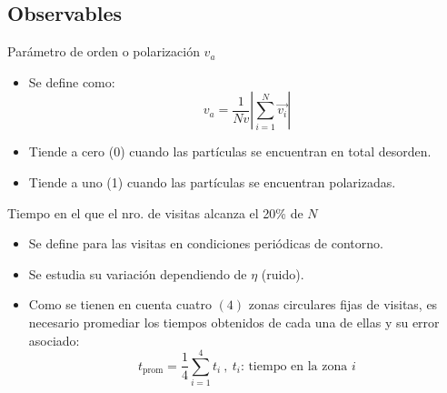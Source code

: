 \documentclass{beamer}
\begin{document}
        \subsection{Observables}

            \begin{frame}{Parámetro de orden o polarización $v_a$}
                \begin{itemize}
                    \item Se define como:
                    \begin{equation}
                        v_a = \frac{1}{Nv} \left|\sum_{i=1}^{N} \vec{v_i} \right|
                    \end{equation}
                    \item Tiende a cero (0) cuando las partículas se encuentran en total desorden.
                    \item Tiende a uno (1) cuando las partículas se encuentran polarizadas.
                \end{itemize}
            \end{frame}

            \begin{frame}{Tiempo en el que el nro. de visitas alcanza el 20\% de $N$ }
                \begin{itemize}
                    \item Se define para las visitas en condiciones periódicas de contorno.
                    \item Se estudia su variación dependiendo de $\eta$ (ruido).
                    \item Como se tienen en cuenta cuatro $(4)$ zonas circulares fijas de visitas, es necesario promediar
                    los tiempos obtenidos de cada una de ellas y su error asociado:
                    \begin{equation}
                        t_{\text{prom}} = \frac{1}{4} \sum_{i=1}^{4} t_i \ ,\ t_i\text{: tiempo en la zona }i
                    \end{equation}
                \end{itemize}
            \end{frame}
\end{document}
